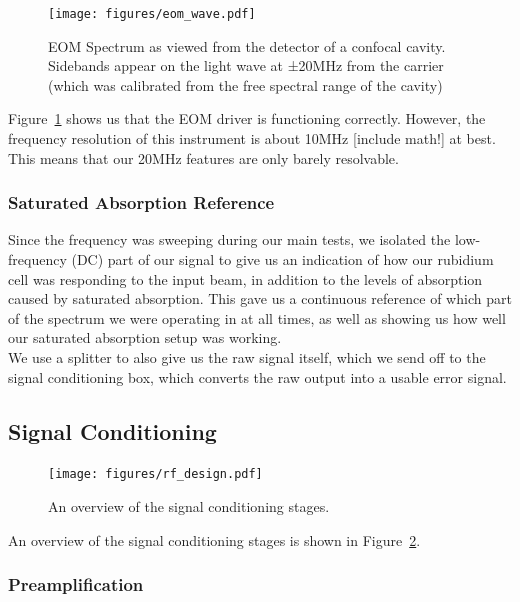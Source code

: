 \begin{figure}
  \centering\texttt{[image: figures/eom\_wave.pdf]}
  \caption{EOM Spectrum as viewed from the detector of a confocal cavity.  Sidebands appear on the light wave at ±20MHz from the carrier (which was calibrated from the free spectral range of the cavity)}
  \label{eom_wave}
\end{figure}

Figure~\ref{eom_wave} shows us that the EOM driver is functioning correctly.  However, the frequency resolution of this instrument is about 10MHz [include math!] at best.  This means that our 20MHz features are only barely resolvable. \\
    
    \subsubsection{Saturated Absorption Reference}
    
Since the frequency was sweeping during our main tests, we isolated the low-frequency (DC) part of our signal to give us an indication of how our rubidium cell was responding to the input beam, in addition to the levels of absorption caused by saturated absorption.  This gave us a continuous reference of which part of the spectrum we were operating in at all times, as well as showing us how well our saturated absorption setup was working. \\

We use a splitter to also give us the raw signal itself, which we send off to the signal conditioning box, which converts the raw output into a usable error signal. \\

\subsection{Signal Conditioning}

\begin{figure}
  \centering\texttt{[image: figures/rf\_design.pdf]}
  \caption{An overview of the signal conditioning stages.}
  \label{rf_design}
\end{figure}

An overview of the signal conditioning stages is shown in Figure~\ref{rf_design}. \\

    \subsubsection{Preamplification}

